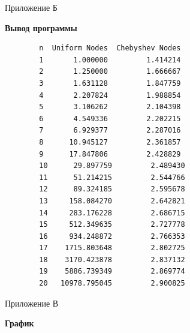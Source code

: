 \documentclass[14pt,openany,a4paper,oneside]{extarticle}
\begin{document}
	\begin{flushright}Приложение Б\end{flushright}
	\centerline{\textbf{Вывод программы}}
	
	\begin{verbatim}
		n  Uniform Nodes  Chebyshev Nodes
		1       1.000000         1.414214
		2       1.250000         1.666667
		3       1.631128         1.847759
		4       2.207824         1.988854
		5       3.106262         2.104398
		6       4.549336         2.202215
		7       6.929377         2.287016
		8      10.945127         2.361857
		9      17.847806         2.428829
		10      29.897759         2.489430
		11      51.214215         2.544766
		12      89.324185         2.595678
		13     158.084270         2.642821
		14     283.176228         2.686715
		15     512.349635         2.727778
		16     934.248872         2.766353
		17    1715.803648         2.802725
		18    3170.423878         2.837132
		19    5886.739349         2.869774
		20   10978.795045         2.900825        
	\end{verbatim}
	
	\newpage
	
	\begin{flushright}Приложение В\end{flushright}
	\centerline{\textbf{График}}
	
	\begin{center}
	\end{center}
\end{document}
